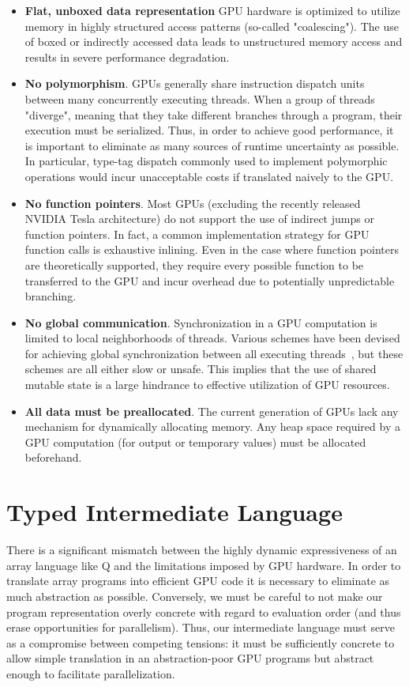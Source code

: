 \documentclass[preprint]{sigplanconf}
\begin{document}
\begin{itemize}
\item \textbf{Flat, unboxed data representation} GPU hardware is optimized to utilize memory in highly structured access patterns (so-called "coalescing"). 
The use of boxed or indirectly accessed data leads to unstructured memory access and results in severe performance degradation. 
\item \textbf{No polymorphism}. GPUs generally share instruction dispatch units between many concurrently executing threads. When a group of threads "diverge", meaning that they take different branches through a program, their execution must be serialized. Thus, in order to achieve good performance, it is important to eliminate as many sources of runtime uncertainty as possible. In particular, type-tag dispatch commonly used to implement polymorphic operations would incur unacceptable costs if translated naively to the GPU. 
\item \textbf {No function pointers}. Most GPUs (excluding the recently released NVIDIA Tesla architecture) do not support the use of indirect jumps or function pointers. In fact, a common implementation strategy for GPU function calls is exhaustive inlining. Even in the case where function pointers are theoretically supported, they require every possible function to be transferred to the GPU and incur overhead due to potentially unpredictable branching. 
\item \textbf{No global communication}. Synchronization in a GPU computation is limited to local neighborhoods of threads. Various schemes have been devised for achieving global synchronization between all executing threads~\cite{feng10}, but these schemes are all either slow or unsafe. This implies that the use of shared mutable state is a large hindrance to effective utilization of GPU resources. 
\item \textbf{All data must be preallocated}. The current generation of GPUs lack any mechanism for dynamically allocating memory. Any heap space required by a GPU computation (for output or temporary values) must be allocated beforehand. 
\end{itemize}

\section{Typed Intermediate Language}
There is a significant mismatch between the highly dynamic expressiveness of an array language like Q and the limitations imposed by GPU hardware. In order to translate array programs into efficient GPU code it is necessary to eliminate as much abstraction as possible. Conversely, we must be careful to not make our program representation overly concrete with regard to evaluation order (and thus erase opportunities for parallelism). Thus, our intermediate language must serve as a compromise between competing tensions: it must be sufficiently concrete to allow simple translation in an abstraction-poor GPU programs but abstract enough to facilitate parallelization. 
\end{document}

